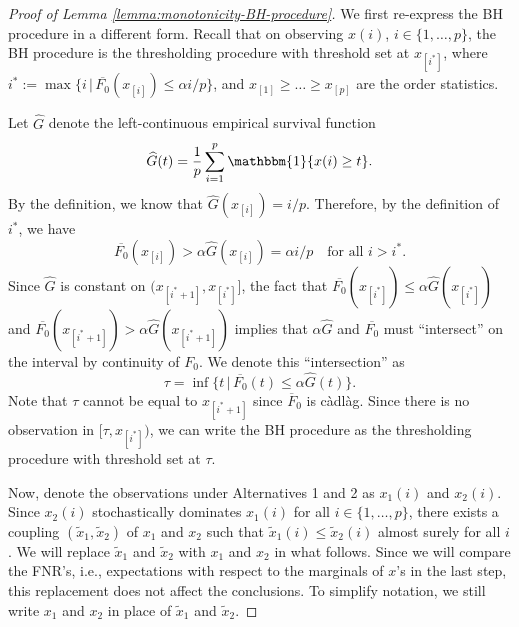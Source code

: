 \begin{proof}[Proof of Lemma \ref{lemma:monotonicity-BH-procedure}]
We first re-express the BH procedure in a different form.
Recall that on observing $x(i)$, $i\in\{1,\ldots,p\}$, the BH procedure is the thresholding procedure with threshold set at $x_{[i^*]}$, where $i^* := \max\{i\,|\,\overline{F_0}(x_{[i]})\le \alpha i/p\}$, and $x_{[1]}\ge\ldots\ge x_{[p]}$ are the order statistics.

Let $\widehat{G}$ denote the left-continuous empirical survival function
\begin{equation} \label{eq:empirical-tail-distribution}
    \widehat{G}(t) = \frac{1}{p}\sum_{i=1}^p\mathbbm{1}\{x(i) \ge t\}.
\end{equation}
By the definition, we know that $\widehat{G}(x_{[i]}) = i/p$.
Therefore, by the definition of $i^*$, we have
\begin{equation*} 
    \overline{F_0}(x_{[i]}) > \alpha\widehat{G}(x_{[i]}) = \alpha i/p \quad \text{for all }i>i^*.
\end{equation*}
Since $\widehat{G}$ is constant on $(x_{[i^*+1]}, x_{[i^*]}]$, the fact that 
$\overline{F_0}(x_{[i^*]}) \le \alpha\widehat{G}(x_{[i^*]})$ and $\overline{F_0}(x_{[i^*+1]}) > \alpha\widehat{G}(x_{[i^*+1]})$ implies that $\alpha\widehat{G}$ and $\overline{F_0}$ must ``intersect'' on the interval by continuity of $F_0$.
We denote this ``intersection'' as
\begin{equation} \label{eq:approx-boundary-proof-tau}
    \tau = \inf\{t\,|\,\overline{F_0}(t)\le\alpha\widehat{G}(t)\}. 
\end{equation}
Note that $\tau$ cannot be equal to $x_{[i^*+1]}$ since $\overline{F}_0$ is c\`adl\`ag.
Since there is no observation in $[\tau, x_{[i^*]})$, we can write the BH procedure as the thresholding procedure with threshold set at $\tau$.

Now, denote the observations under Alternatives 1 and 2 as $x_1(i)$ and $x_2(i)$.
Since $x_2(i)$ stochastically dominates $x_1(i)$ for all $i\in\{1,\ldots,p\}$, there exists a coupling $(\widetilde{x}_1, \widetilde{x}_2)$ of $x_1$ and $x_2$ such that 
$\widetilde{x}_1(i) \le \widetilde{x}_2(i)$ almost surely for all $i$.
We will replace $\widetilde{x}_1$ and $\widetilde{x}_2$ with $x_1$ and $x_2$ in what follows.
Since we will compare the FNR's, i.e., expectations with respect to the marginals of ${x}$'s in the last step, this replacement does not affect the conclusions.
To simplify notation, we still write $x_1$ and $x_2$ in place of $\widetilde{x}_1$ and $\widetilde{x}_2$.


\end{proof}
